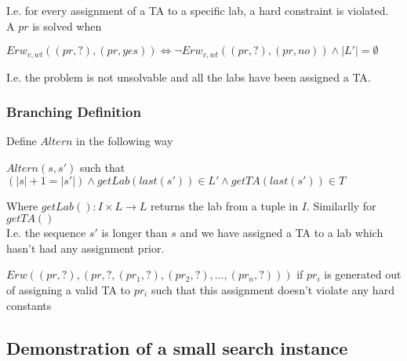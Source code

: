 \documentclass{article}
\begin{document}
I.e. for every assignment of a TA to a specific lab, a hard constraint
is violated.\\

A $pr$ is solved when\\

\begin{center}
  $Erw_{v,wt}((pr, ?),(pr, yes)) \iff \lnot Erw_{v,wt}((pr, ?),(pr,
  no)) \land |L'| = \emptyset$

\end{center}

I.e. the problem is not unsolvable and all the labs have been assigned
a TA.

\subsubsection{Branching Definition}

Define $Altern$ in the following way 

\begin{center}
  $Altern(s, s')$ such that $(|s| + 1 = |s'|) \land getLab(last(s')) \in
  L' \land getTA(last(s')) \in T$ 
\end{center}

Where $getLab() : I \times L \rightarrow L$ returns the lab from a
tuple in $I$. Similarlly for $getTA()$\\

I.e. the sequence $s'$ is longer than $s$ and we have assigned a TA to a lab
which hasn't had any assignment prior.

\begin{center}
  $Erw((pr, ?), (pr, ?, (pr_1, ?), (pr_2, ?), ... , (pr_n, ?)))$ if $pr_i$
  is generated out of assigning a valid TA to $pr_i$ such that this
  assignment doesn't violate any hard constants
\end{center}

\subsection{Demonstration of a small search instance}
\end{document}
